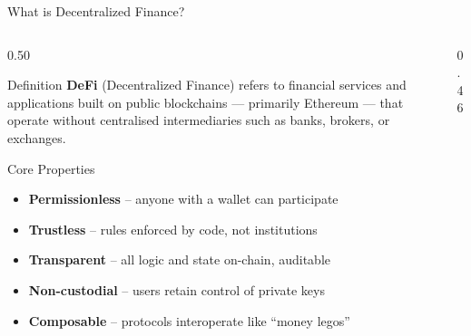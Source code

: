 \documentclass[8pt,aspectratio=169]{beamer}
\begin{document}
\begin{frame}{What is Decentralized Finance?}
  \begin{columns}[T]
    \begin{column}{0.50\textwidth}
      \begin{block}{Definition}
        \textbf{DeFi} (Decentralized Finance) refers to financial services and applications built on
        public blockchains --- primarily Ethereum --- that operate without centralised intermediaries
        such as banks, brokers, or exchanges.
      \end{block}
      \vspace{3mm}
      \begin{block}{Core Properties}
        \begin{itemize}\setlength\itemsep{2pt}
          \item \textbf{Permissionless} -- anyone with a wallet can participate
          \item \textbf{Trustless} -- rules enforced by code, not institutions
          \item \textbf{Transparent} -- all logic and state on-chain, auditable
          \item \textbf{Non-custodial} -- users retain control of private keys
          \item \textbf{Composable} -- protocols interoperate like ``money legos''
        \end{itemize}
      \end{block}
    \end{column}
    \begin{column}{0.46\textwidth}
\end{column}
\end{columns}
\end{frame}
\end{document}
